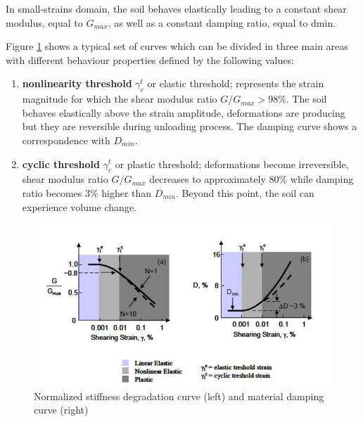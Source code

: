\documentclass[11pt,a4paper]{report}
\begin{document}
In small-strains domain, the soil behaves elastically leading to a constant shear modulus, equal to $G_{max}$, as well as a constant damping ratio, equal to \gls{dmin}.

Figure \ref{normalized} shows a typical set of curves which can be divided in three main areas with different behaviour properties defined by the following values:
\begin{enumerate}
	\item \textbf{nonlinearity threshold} $\gamma_e^t$ or elastic threshold; represents the strain magnitude for which the shear modulus ratio $G/G_{max}>98\%$. The soil behaves elastically above the strain amplitude, deformations are producing but they are reversible during unloading process. The damping curve shows a correspondence with $D_{min}$. 
	\item \textbf{cyclic threshold} $\gamma_c^t$ or plastic threshold; deformations become irreversible, shear modulus ratio $G/G_{max}$ decreases to approximately 80\% while damping ratio becomes 3\% higher than $D_{min}$. Beyond this point, the soil can experience volume change. 
\end{enumerate}

\begin{figure}[h!]
	\centering
	\includegraphics[width=0.8\linewidth]{"normalized"}
	\caption{Normalized stiffness degradation curve (left) and material damping curve (right)}
	\label{normalized}
\end{figure}
\end{document}
